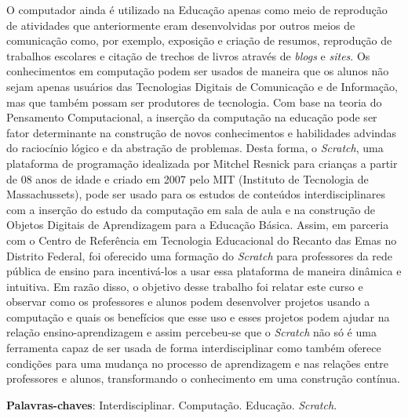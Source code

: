 \documentclass[12pt, openright, a4paper, brazil, english, french, spanish, bibjustif, openany, oneside]{abntex2}
\begin{document}

\begin{resumo}

O computador ainda é utilizado na Educação apenas como meio de reprodução de atividades que anteriormente eram desenvolvidas por outros meios de comunicação como, por exemplo, exposição e criação de resumos, reprodução de trabalhos escolares e citação de trechos de livros através de \textit{blogs} e \textit{sites}. Os conhecimentos em computação podem ser usados de maneira que os alunos não sejam apenas usuários das Tecnologias Digitais de Comunicação e de Informação, mas que também possam ser produtores de tecnologia. Com base na teoria do Pensamento Computacional, a inserção da computação na educação pode ser fator determinante na construção de novos conhecimentos e habilidades advindas do raciocínio lógico e da abstração de problemas. Desta forma, o \textit{Scratch}, uma plataforma de programação idealizada por Mitchel Resnick para crianças a partir de 08 anos de idade e criado em 2007 pelo MIT (Instituto de Tecnologia de Massachussets), pode ser usado para os estudos de conteúdos interdisciplinares com a inserção do estudo da computação em sala de aula e na construção de Objetos Digitais de Aprendizagem para a Educação Básica. Assim, em parceria com o Centro de Referência em Tecnologia Educacional do Recanto das Emas no Distrito Federal, foi oferecido uma formação do \textit{Scratch} para professores da rede pública de ensino para incentivá-los a usar essa plataforma de maneira dinâmica e intuitiva. Em razão disso, o objetivo desse trabalho foi relatar este curso e observar como os professores e alunos podem desenvolver projetos usando a computação e quais os benefícios que esse uso e esses projetos podem ajudar na relação ensino-aprendizagem e assim percebeu-se que o \textit{Scratch} não só é uma ferramenta capaz de ser usada de forma interdisciplinar como também oferece condições para uma mudança no processo de aprendizagem e nas relações entre professores e alunos, transformando o conhecimento em uma construção contínua.


 \vspace{\onelineskip}
    
 \noindent
 \textbf{Palavras-chaves}: Interdisciplinar. Computação. Educação. \textit{Scratch}.
\end{resumo}

\end{document}
